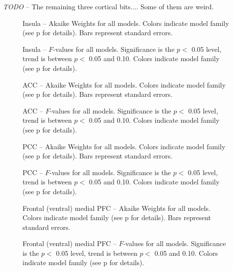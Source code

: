 \documentclass[doc,12pt]{apa}        %
\begin{document}
\emph{TODO} -- The remaining three cortical bits....  Some of them are weird.

\begin{figure}[tp]
    \centering
    \caption{Insula -- Akaike Weights for all models.  Colors indicate model family (see p\pageref{sub:cmb} for details). Bars represent standard errors.}
	\label{fig:insula}
\end{figure}
\begin{figure}[tp]
    \centering
    \caption{Insula -- $F$-values for all models.  Significance is the $p <$ 0.05 level, trend is between $p <$ 0.05 and 0.10.  Colors indicate model family (see p\pageref{sub:cmb} for details).}
	\label{fig:fvalinsula}
\end{figure}


\begin{figure}[tp]
    \centering
    \caption{ACC -- Akaike Weights for all models.  Colors indicate model family (see p\pageref{sub:cmb} for details). Bars represent standard errors.}
	\label{fig:ant}
\end{figure}
\begin{figure}[tp]
    \centering
    \caption{ACC -- $F$-values for all models.  Significance is the $p <$ 0.05 level, trend is between $p <$ 0.05 and 0.10.  Colors indicate model family (see p\pageref{sub:cmb} for details).}
	\label{fig:fvalant}
\end{figure}


\begin{figure}[tp]
    \centering
    \caption{PCC -- Akaike Weights for all models.  Colors indicate model family (see p\pageref{sub:cmb} for details). Bars represent standard errors.}
	\label{fig:post}
\end{figure}
\begin{figure}[tp]
    \centering
    \caption{PCC -- $F$-values for all models.  Significance is the $p <$ 0.05 level, trend is between $p <$ 0.05 and 0.10.  Colors indicate model family (see p\pageref{sub:cmb} for details).}
	\label{fig:fvalpost}
\end{figure}


\begin{figure}[tp]
    \centering
    \caption{Frontal (ventral) medial PFC -- Akaike Weights for all models.  Colors indicate model family (see p\pageref{sub:cmb} for details). Bars represent standard errors.}
	\label{fig:vmpfc}
\end{figure}
\begin{figure}[tp]
    \centering
    \caption{Frontal (ventral) medial PFC -- $F$-values for all models.  Significance is the $p <$ 0.05 level, trend is between $p <$ 0.05 and 0.10.  Colors indicate model family (see p\pageref{sub:cmb} for details).}
	\label{fig:fvalvmpfc}
\end{figure}
\end{document}
